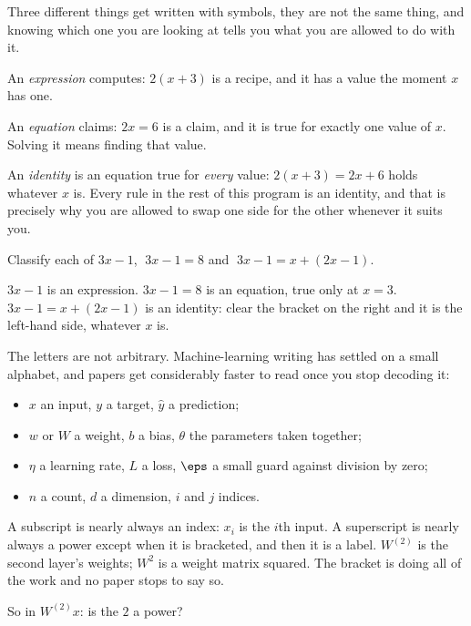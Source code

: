 \begin{fr}
Three different things get written with symbols, they are not the same thing,
and knowing which one you are looking at tells you what you are allowed to do
with it.

An \emph{expression} computes: $2(x+3)$ is a recipe, and it has a value the
moment $x$ has one.

An \emph{equation} claims: $2x = 6$ is a claim, and it is true for exactly one
value of $x$. Solving it means finding that value.

An \emph{identity} is an equation true for \emph{every} value:
$2(x+3) = 2x+6$ holds whatever $x$ is. Every rule in the rest of this program
is an identity, and that is precisely why you are allowed to swap one side for
the other whenever it suits you.

Classify each of $3x - 1$, $\;3x - 1 = 8$ and $\;3x - 1 = x + (2x - 1)$.
\dotline
\nextframe
\end{fr}

\begin{fr}
\begin{ansblock}
$3x - 1$ is an expression. \quad $3x - 1 = 8$ is an equation, true only at
$x = 3$. \quad $3x - 1 = x + (2x - 1)$ is an identity: clear the bracket on the
right and it is the left-hand side, whatever $x$ is.
\end{ansblock}

\begin{notationbox}
The letters are not arbitrary. Machine-learning writing has settled on a small
alphabet, and papers get considerably faster to read once you stop decoding it:

\begin{itemize}
\item $x$ an input, $y$ a target, $\hat{y}$ a prediction;
\item $w$ or $W$ a weight, $b$ a bias, $\theta$ the parameters taken together;
\item $\eta$ a learning rate, $L$ a loss, $\eps$ a small guard against
  division by zero;
\item $n$ a count, $d$ a dimension, $i$ and $j$ indices.
\end{itemize}

A subscript is nearly always an index: $x_{i}$ is the $i$th input. A superscript
is nearly always a power \dash{} except when it is bracketed, and then it is a
label. $W^{(2)}$ is the second layer's weights; $W^{2}$ is a weight matrix
squared. The bracket is doing all of the work and no paper stops to say so.
\end{notationbox}

So in $W^{(2)}x$: is the $2$ a power?
\nextframe
\end{fr}

